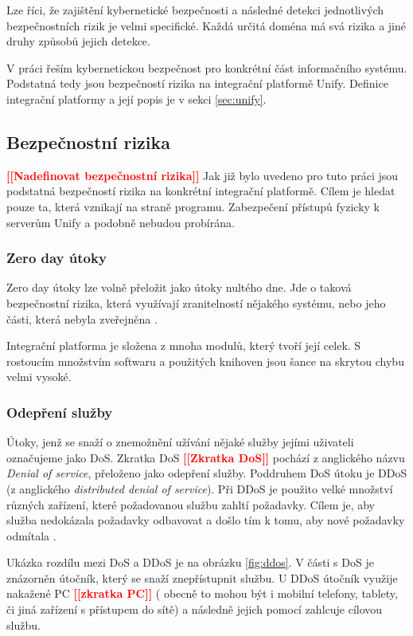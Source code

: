 \documentclass[thesis=M,czech]{FITthesis}[2012/10/20]
\newcommand{\todo}[1]{\textcolor{red}{\textbf{[[#1]]}}}
\begin{document}
		Lze říci, že zajištění kybernetické bezpečnosti a následné detekci jednotlivých bezpečnostních rizik je velmi specifické. Každá určitá doména má svá rizika a jiné druhy způsobů jejich detekce. 
		
		V práci řeším kybernetickou bezpečnost pro konkrétní část informačního systému. Podstatná tedy jsou bezpečností rizika na integrační platformě Unify. Definice integrační platformy a její popis je v sekci \ref{sec:unify}.
		
		\subsection{Bezpečnostní rizika}
		\todo{Nadefinovat bezpečnostní rizika}
			Jak již bylo uvedeno pro tuto práci jsou podstatná bezpečností rizika na konkrétní integrační platformě. Cílem je hledat pouze ta, která vznikají na straně programu. Zabezpečení přístupů fyzicky k serverům Unify a podobně nebudou probírána.
			
			\subsubsection{Zero day útoky}
				\label{sec:zero-day}
				Zero day útoky lze volně přeložit jako útoky nultého dne.
				Jde o taková bezpečnostní rizika, která využívají zranitelností nějakého systému, nebo jeho části, která nebyla zveřejněna \cite{investigationZ0}.
				
				Integrační platforma je složena z mnoha modulů, který tvoří její celek. S rostoucím množstvím softwaru a použitých knihoven jsou šance na skrytou chybu velmi vysoké. 
			
			\subsubsection{Odepření služby}
				Útoky, jenž se snaží o znemožnění užívání nějaké služby jejími uživateli označujeme jako DoS. Zkratka DoS \todo{Zkratka DoS} pochází z anglického názvu \textit{Denial of service}, přeloženo jako odepření služby. Poddruhem DoS útoku je DDoS (z anglického \textit{distributed denial of service}). Při DDoS je použito velké množství různých zařízení, které požadovanou službu zahltí požadavky. Cílem je, aby služba nedokázala požadavky odbavovat a došlo tím k tomu, aby nové požadavky odmítala \cite{dosAndDdos}.
				
				Ukázka rozdílu mezi DoS a DDoS je na obrázku \ref{fig:ddos}. V části s DoS je znázorněn útočník, který se snaží znepřístupnit službu. U DDoS útočník využije nakažené PC \todo{zkratka PC} ( obecně to mohou být i mobilní telefony, tablety, či jiná zařízení s přístupem do sítě) a následně jejich pomocí zahlcuje cílovou službu.	
				
\end{document}
